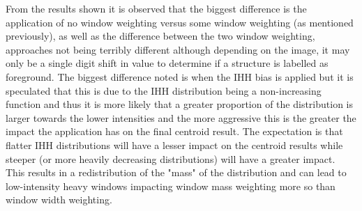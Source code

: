 From the results shown it is observed that the biggest difference is the application of no window weighting versus some window weighting (as mentioned previously), as well as the difference between the two window weighting, approaches not being terribly different although depending on the image, it may only be a single digit shift in value to determine if a structure is labelled as foreground. The biggest difference noted is when the IHH bias is applied but it is speculated that this is due to the IHH distribution being a non-increasing function and thus it is more likely that a greater proportion of the distribution is larger towards the lower intensities and the more aggressive this is the greater the impact the application has on the final centroid result. The expectation is that flatter IHH distributions will have a lesser impact on the centroid results while steeper (or more heavily decreasing distributions) will have a greater impact. This results in a redistribution of the "mass" of the distribution and can lead to low-intensity heavy windows impacting window mass weighting more so than window width weighting.

